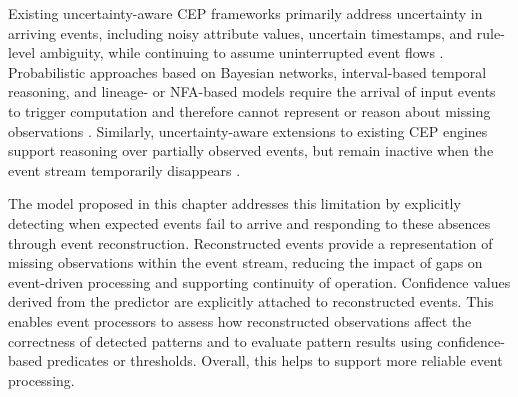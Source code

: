 Existing uncertainty-aware CEP frameworks primarily address uncertainty in arriving events, including noisy attribute values, uncertain timestamps, and rule-level ambiguity, while continuing to assume uninterrupted event flows \citep{alevizos2017probabilistic}. Probabilistic approaches based on Bayesian networks, interval-based temporal reasoning, and lineage- or NFA-based models require the arrival of input events to trigger computation and therefore cannot represent or reason about missing observations \citep{wasserkrug2010efficient, wasserkrug2012model, zhang2013recognizing, shen2008probabilistic, kawashima2010complex, chuanfei2010complex, wang2013complex}. Similarly, uncertainty-aware extensions to existing CEP engines support reasoning over partially observed events, but remain inactive when the event stream temporarily disappears \citep{cugola2015introducing, moreno2019managing}.

The model proposed in this chapter addresses this limitation by explicitly detecting when expected events fail to arrive and responding to these absences through event reconstruction. Reconstructed events provide a representation of missing observations within the event stream, reducing the impact of gaps on event-driven processing and supporting continuity of operation. Confidence values derived from the predictor are explicitly attached to reconstructed events. This enables event processors to assess how reconstructed observations affect the correctness of detected patterns and to evaluate pattern results using confidence-based predicates or thresholds. Overall, this helps to support more reliable event processing.
